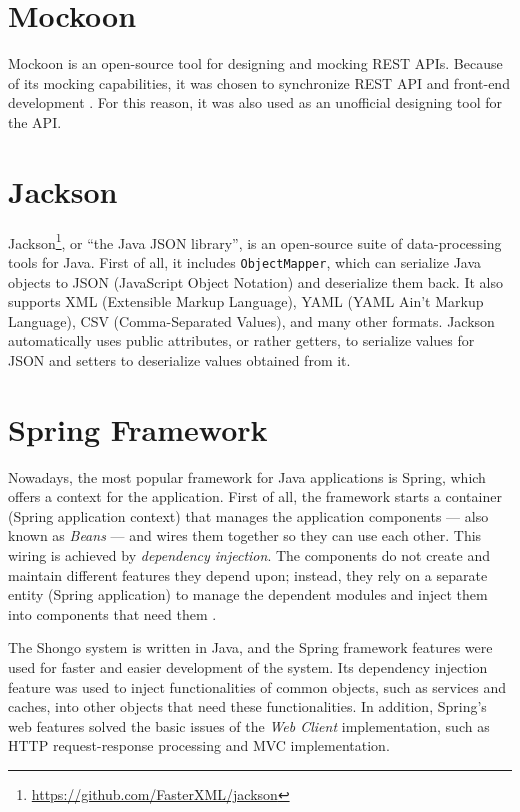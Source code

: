 \section{Mockoon} \label{sec:mockoon}
Mockoon is an open-source tool for designing and mocking REST APIs.
Because of its mocking capabilities, it was chosen to synchronize REST API and front-end development \cite{drobnakm}.
For this reason, it was also used as an unofficial designing tool for the API.


\section{Jackson} \label{sec:jackson}
Jackson\footnote{\url{https://github.com/FasterXML/jackson}}, or \enquote{the Java JSON library}, is an open-source suite of data-processing tools for Java. First of all, it includes \texttt{ObjectMapper}, which can serialize Java objects to JSON (JavaScript Object Notation) and deserialize them back.
It also supports XML (Extensible Markup Language), YAML (YAML Ain't Markup Language), CSV (Comma-Separated Values), and many other formats.
Jackson automatically uses public attributes, or rather getters, to serialize values for JSON and setters to deserialize values obtained from it.


\section{Spring Framework} \label{sec:spring}
Nowadays, the most popular framework for Java applications is Spring, which offers a context for the application.
First of all, the framework starts a container (Spring application context) that manages the application components --- also known as \emph{Beans} --- and wires them together so they can use each other. This wiring is achieved by \emph{dependency injection}.
The components do not create and maintain different features they depend upon; instead, they rely on a separate entity (Spring application) to manage the dependent modules and inject them into components that need them \cite{walls2022spring}.

The Shongo system is written in Java, and the Spring framework features were used for faster and easier development of the system. Its dependency injection feature was used to inject functionalities of common objects, such as services and caches, into other objects that need these functionalities. In addition, Spring’s web features solved the basic issues of the \emph{Web Client} implementation, such as HTTP request-response processing and MVC implementation.

